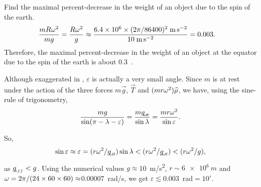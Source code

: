 \exm Find the maximal percent-decrease in the weight of an 
object due to the spin of the earth. 
\soln 
\begin{align} 
\frac{mR {\omega}^2}{mg} = \frac{R {\omega}^2}{g}&\approx\frac{6.4 
\times 10^6 \times (2\pi/86400)^2\; 
\SI{}{m.s^{-2}}}{10\;\SI{}{m.s^{-2}}} =0.003. 
\end{align} 
Therefore, the maximal percent-decrease in the weight of an 
object at the equator due to the spin of the earth is about 
0.3~.


\soln Although exaggerated in , $\varepsilon 
$ is actually a very small angle. Since $m$ is at rest 
under the action of the three forces $m\vec{g}$, $\vec{T}$ 
and $(mr{\omega}^2){\widehat{\rho}}$, we have, using the sine-rule of 
trigonometry, 
\begin{align}
\frac{mg}{\sin(\pi-\lambda-\varepsilon)}
=\frac{mg_{_{\hspace*{-1.5pt}{\text{eff}}}}}{\sin\lambda} =
\frac{mr{\omega}^2}{\sin\varepsilon}.
\end{align}
%
\begin{figure}[H]
\begin{center}
\caption{}\label{fig2.6}
\end{center}
\end{figure}
%
So,
\begin{align}
\sin\varepsilon\approx \varepsilon =
(r{\omega}^2/g_{_{\hspace*{-1.5pt}{\text{eff}}}}) \sin\lambda <
(r{\omega}^2/g_{_{\hspace*{-1.5pt}{\text{eff}}}}) < (r{\omega}^2/g),
\end{align}
as $ g_{{_{\hspace*{-1.5pt}{eff}}}}<g $. Using the numerical values $ 
g\approx$\SI{10}{m/s^2}, $r\sim \SI{6e6}{m}$ and 
${\omega}=2\pi/(24\times 60\times 60) \approx 
$\SI{.00007}{rad/s}, we get $\varepsilon 
\lesssim$\SI{0.003}{rad}$=10'$.

\vspace{-.3cm}


